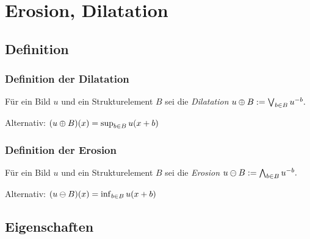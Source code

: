 \documentclass{beamer}
\begin{document}
\section{Erosion, Dilatation}

\subsection{Definition}

\begin{frame}
    \frametitle{Definition der Dilatation}
    \begin{definition}
        Für ein Bild $u$ und ein Strukturelement $B$ sei die \emph{Dilatation}
        \begin{math}
            u \oplus B := \bigvee_{b \in B} u^{-b}.
        \end{math}
    \end{definition}
    Alternativ: $(u \oplus B)(x) = \sup_{b \in B} u(x + b)$
\end{frame}

\begin{frame}
    \frametitle{Definition der Erosion}
    \begin{definition}
        Für ein Bild $u$ und ein Strukturelement $B$ sei die \emph{Erosion}
        \begin{math}
            u \ominus B := \bigwedge_{b \in B} u^{-b}.
        \end{math}
    \end{definition}
    Alternativ: $(u \ominus B)(x) = \inf_{b \in B} u(x + b)$
\end{frame}

\subsection{Eigenschaften}
\end{document}
